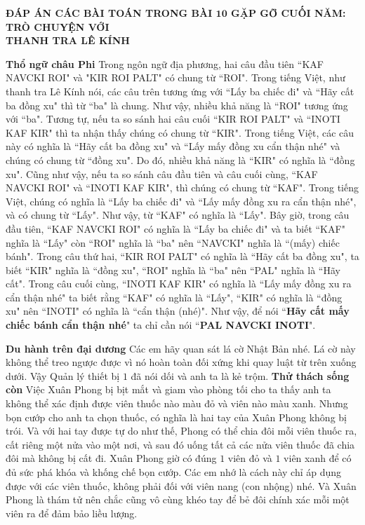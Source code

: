 \newpage
\begin{center}
	\textbf{\color{toancuabi}ĐÁP ÁN CÁC BÀI TOÁN TRONG BÀI $\pmb{10}$ GẶP GỠ CUỐI NĂM: TRÒ CHUYỆN VỚI \\
		THANH TRA LÊ KÍNH}
\end{center}
\textbf{\color{toancuabi}Thổ ngữ châu Phi} 
\vskip 0.1cm
Trong ngôn ngữ địa phương, hai câu đầu tiên  ``KAF NAVCKI ROI" và "KIR ROI PALT" có chung từ ``ROI". Trong tiếng Việt, như thanh tra Lê Kính nói, các câu trên tương ứng với ``Lấy ba chiếc đi" và ``Hãy cất ba đồng xu" thì từ ``ba" là chung. Như vậy, nhiều khả năng là ``ROI" tương ứng với ``ba".
\vskip 0.1cm
Tương tự, nếu ta so sánh hai câu cuối ``KIR ROI PALT" và \linebreak ``INOTI KAF KIR" thì ta nhận thấy chúng có chung từ ``KIR". Trong tiếng Việt, các câu này có nghĩa là ``Hãy cất ba đồng xu" và ``Lấy mấy đồng xu cẩn thận nhé" và chúng có chung từ ``đồng xu". Do đó, nhiều khả năng là ``KIR" có nghĩa là ``đồng xu". 
\vskip 0.1cm
Cũng như vậy, nếu ta so sánh câu đầu tiên và câu cuối cùng, ``KAF NAVCKI ROI" và ``INOTI KAF KIR", thì chúng có chung từ ``KAF".  Trong tiếng Việt, chúng có nghĩa là ``Lấy ba chiếc đi" và ``Lấy mấy đồng xu ra cẩn thận nhé", và có chung từ ``Lấy". Như vậy, từ ``KAF" có nghĩa là ``Lấy".
\vskip 0.1cm
Bây giờ, trong câu đầu tiên, ``KAF NAVCKI ROI" có nghĩa là ``Lấy ba chiếc đi" và ta biết ``KAF" nghĩa là ``Lấy" còn ``ROI" nghĩa là ``ba" nên ``NAVCKI" nghĩa là ``(mấy) chiếc bánh". Trong câu thứ hai, ``KIR ROI PALT" có nghĩa là ``Hãy cất ba đồng xu", ta biết ``KIR" nghĩa là ``đồng xu", ``ROI" nghĩa là ``ba" nên ``PAL" nghĩa là ``Hãy cất". Trong câu cuối cùng, ``INOTI KAF KIR" có nghĩa là ``Lấy mấy đồng xu ra cẩn thận nhé" ta biết rằng ``KAF" có nghĩa là ``Lấy", ``KIR" có nghĩa là ``đồng xu" nên ``INOTI" có nghĩa là ``cẩn thận (nhé)".
\vskip 0.1cm
Như vậy, để nói ``\textbf{\color{toancuabi}Hãy cất mấy chiếc  bánh cẩn thận nhé}" ta chỉ cần nói ``\textbf{\color{toancuabi}PAL NAVCKI INOTI}".

\vskip 0.1cm
\textcolor{timhieukhoahoc}{\textbf{\color{toancuabi}Du hành trên đại dương}}
\vskip 0.1cm
Các em hãy quan sát lá cờ Nhật Bản nhé. Lá cờ này không thể treo ngược được vì nó hoàn toàn đối xứng khi quay luật từ trên xuống dưới. Vậy Quản lý thiết bị $1$ đã nói dối và anh ta là kẻ trộm.
\vskip 0.1cm
\textbf{\color{toancuabi}\color{toancuabi} Thử thách sống còn}
\vskip 0.1cm
Việc Xuân Phong bị bịt mắt và giam vào phòng tối cho ta thấy anh ta không thể xác  định được viên thuốc nào màu đỏ và viên nào màu xanh. Nhưng bọn cướp cho anh ta chọn thuốc, có nghĩa là hai tay của Xuân Phong không bị trói. Và với hai tay được tự do như thế, Phong có thể chia đôi mỗi viên thuốc ra, cất riêng một nửa vào một nơi, và sau đó uống tất cả các nửa viên thuốc đã chia đôi mà không bị cất đi. Xuân Phong giờ có đúng $1$ viên đỏ và $1$ viên xanh để có đủ sức phá khóa và khống chế bọn cướp. Các em nhớ là cách này chỉ áp dụng được với các viên thuốc, không phải đối với viên nang (con nhộng) nhé. Và Xuân Phong là thám tử nên chắc cũng vô cùng khéo tay để bẻ đôi chính xác mỗi một viên ra để đảm bảo liều lượng.

